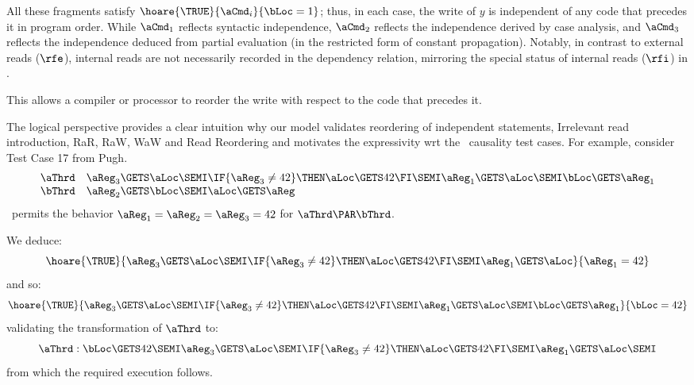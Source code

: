 All these fragments satisfy  $\hoare{\TRUE}{\aCmd_i}{\bLoc =1}$; thus, in each case, the write of $y$ is independent of
any code that precedes it in program order. While $\aCmd_1$ reflects syntactic independence,  $\aCmd_2$ reflects the independence derived by case analysis, and $\aCmd_3$ reflects the independence deduced from partial evaluation (in the restricted form of constant propagation).  Notably, in contrast to external reads ($\rfe$), internal reads are not necessarily recorded in the dependency relation, mirroring the special status of internal reads ($\rfi$) in \armeight.  

This allows a compiler or processor to reorder the write with respect to the code that precedes it.  

The logical perspective  provides a clear intuition why our model validates reordering of independent statements,  Irrelevant read introduction, RaR, RaW, WaW and Read Reordering and motivates the expressivity wrt the \jmm\ causality test cases.  For example, consider Test Case 17  from Pugh.
\[
\begin{array}{ll}
\aThrd & \aReg_3 \GETS \aLoc \SEMI \IF{\aReg_3 \neq 42} \THEN \aLoc \GETS 42  \FI \SEMI \aReg_1 \GETS \aLoc \SEMI \bLoc \GETS \aReg_1  \\
\bThrd & \aReg_2 \GETS \bLoc \SEMI \aLoc \GETS \aReg 
\end{array}
\]
\jmm\ permits the behavior $\aReg_1 = \aReg_2 = \aReg_3 =42$ for $\aThrd \PAR \bThrd$. 

We deduce:
\[
\hoare{\TRUE}{\aReg_3 \GETS \aLoc \SEMI \IF{\aReg_3 \neq 42} \THEN \aLoc \GETS 42  \FI \SEMI \aReg_1 \GETS \aLoc }{\aReg_1 =42}
\]
and so:
\[
\hoare{\TRUE}{\aReg_3 \GETS \aLoc \SEMI \IF{\aReg_3 \neq 42} \THEN \aLoc \GETS 42  \FI \SEMI \aReg_1 \GETS \aLoc  \SEMI \bLoc \GETS \aReg_1  }{\bLoc =42}
\]
validating the transformation of $\aThrd$ to:
\[ \aThrd: \bLoc \GETS 42 \SEMI \aReg_3 \GETS \aLoc \SEMI \IF{\aReg_3 \neq 42} \THEN \aLoc \GETS 42  \FI \SEMI \aReg_1 \GETS \aLoc \SEMI \]
from which the required execution follows.

